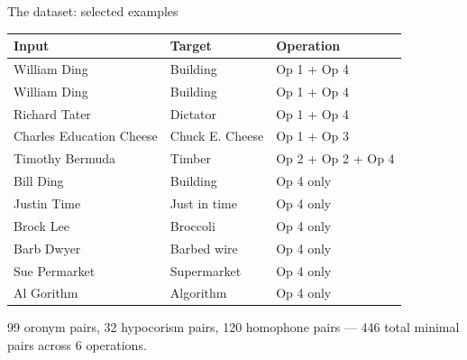 \documentclass[10pt,aspectratio=169]{beamer}
\begin{document}
\begin{frame}{The dataset: selected examples}

\begin{center}
\renewcommand{\arraystretch}{1.3}
\begin{tabular}{lll}
\toprule
\textbf{Input} & \textbf{Target} & \textbf{Operation} \\
\midrule
William Ding & Building & Op 1 + Op 4 \\
William Ding & Building & Op 1 + Op 4 \\
Richard Tater & Dictator & Op 1 + Op 4 \\
Charles Education Cheese & Chuck E. Cheese & Op 1 + Op 3 \\
Timothy Bermuda & Timber & Op 2 + Op 2 + Op 4 \\
\midrule
Bill Ding & Building & Op 4 only \\
Justin Time & Just in time & Op 4 only \\
Brock Lee & Broccoli & Op 4 only \\
Barb Dwyer & Barbed wire & Op 4 only \\
\midrule
Sue Permarket & Supermarket & Op 4 only \\
Al Gorithm & Algorithm & Op 4 only \\
\bottomrule
\end{tabular}
\end{center}

\vspace{0.3em}
{\small 99 oronym pairs, 32 hypocorism pairs, 120 homophone pairs --- 446 total minimal pairs across 6 operations.}
\end{frame}
\end{document}
